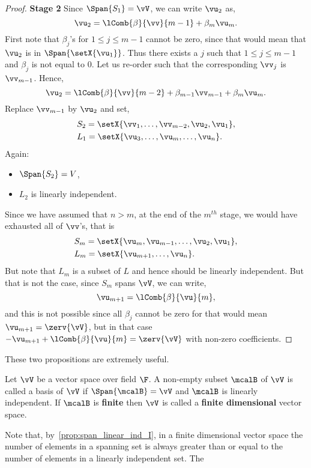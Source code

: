 \begin{proof}
    \textbf{Stage 2}
    Since $\Span{S_1} = \vV$, we can write $\vu_{2}$ as,
    \[\vu_{2} = \lComb{\beta}{\vv}{m-1} + \beta_m\vu_m.\]
    First note that $\beta_j$'s for $1\leq j \leq m-1$ 
    cannot be zero, since that would mean that $\vu_{2}$ is in $\Span{\setX{\vu_{1}}}$. Thus there exists a
    $j$ such that $1\leq j \leq m-1$ and $\beta_j$ is not equal to $0$. Let us re-order such that the
    corresponding $\vv_{j}$ is $\vv_{m-1}$. Hence,
    \[\vu_{2} = \lComb{\beta}{\vv}{m-2} + \beta_{m-1}\vv_{m-1} + \beta_m\vu_m.\]
    Replace $\vv_{m-1}$ by $\vu_{2}$ and set,
    \begin{align*}
	&S_2 = \setX{\vv_{1},\ldots,\vv_{m-2},\vu_2,\vu_1},\\
	&L_1 = \setX{\vu_{3},\ldots,\vu_{m},\ldots,\vu_{n}}.
    \end{align*}
    Again:
    \begin{itemize}
	\item
	    $\Span{S_2} = V$,
	\item
	    $L_2$ is linearly independent.
    \end{itemize}
    Since we have assumed that $n > m$, at the end of the $m^{th}$ stage, we would have exhausted 
    all of $\vv$'s, that is 
    \begin{align*}
	&S_m = \setX{\vu_{m},\vu_{m-1},\ldots,\vu_2,\vu_1},\\
	&L_m = \setX{\vu_{m+1},\ldots,\vu_{n}}.
    \end{align*}
    But note that $L_m$ is a subset of $L$ and hence should be linearly independent. But that is not the case,
    since $S_m$ spans $\vV$, we can write,
    \[\vu_{m+1} = \lComb{\beta}{\vu}{m},\]
    and this is not possible since all $\beta_j$ cannot be zero for that would mean $\vu_{m+1} = \zerv{\vV}$,
    but in that case $-\vu_{m+1} + \lComb{\beta}{\vu}{m} =\zerv{\vV}$ with non-zero coefficients.
\end{proof}
These two propositions are extremely useful. 
\begin{Definition}[name=Basis]
    Let $\vV$ be a vector space over field $\F$. A non-empty subset $\mcalB$ of $\vV$ is called a basis of
    $\vV$ if $\Span{\mcalB} = \vV$ and $\mcalB$ is linearly independent. If $\mcalB$ is \textbf{finite} then
    $\vV$ is called a \textbf{finite dimensional} vector space.
\end{Definition}
Note that, by~\ref{prop:span_linear_ind_I}, in a finite dimensional vector space the number of elements in a
spanning set is always greater than or equal to the number of elements in a linearly independent set. The

